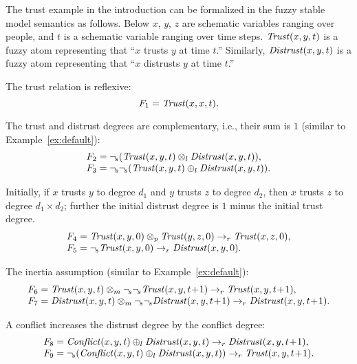 \documentclass[runningheads]{llncs}
\def\ba{\begin{array}}
\def\ea{\end{array}}
\def\i#1{\hbox{\it #1\/}}
\def\sneg{\sim\!\!}
\def\rar{\rightarrow}
\def\i#1{\hbox{\itshape #1\/}}
\def\fand{\otimes}
\def\for{\oplus}
\begin{document}
\begin{example}\label{ex:trust}
The trust example in the introduction can be formalized in the fuzzy stable model semantics as follows. 
Below $x$, $y$, $z$ are schematic variables ranging over people, and $t$ is
a schematic variable ranging over time steps. $\i{Trust}(x,y,t)$
is a fuzzy atom representing that ``$x$ trusts $y$ at time $t$.''
Similarly, $\i{Distrust}(x,y,t)$ is a fuzzy atom representing that 
``$x$ distrusts $y$ at time $t$.'' 


The trust relation is reflexive: 
\[ 
  F_1 = \i{Trust}(x,x,t) .
\]





The trust and distrust degrees are complementary, i.e., their sum is
$1$ (similar to Example~\ref{ex:default}): %
\[ 
\ba l 
   F_2 = \neg_{\!s} (\i{Trust}(x,y,t)\fand_l \i{Distrust}(x,y,t)),  \\
   F_3 = \neg_{\!s} \neg_{\!s} (\i{Trust}(x,y,t)\for_l\i{Distrust}(x,y,t)).

\ea 
\]

Initially, if $x$ trusts $y$ to degree $d_1$ and $y$ trusts $z$ to
degree $d_2$, then $x$ trusts $z$ to degree $d_1\times d_2$; further
the initial distrust degree is $1$ minus the initial trust degree.
\[ 
\ba l
   F_4 = \i{Trust}(x,y,0)\fand_p\i{Trust}(y,z,0)\rar_r\i{Trust}(x,z,0), \\
   F_5 = \neg_{\!s}\i{Trust}(x,y,0)\rar_r\i{Distrust}(x,y,0).
\ea 
\]

The inertia assumption (similar to Example~\ref{ex:default}): %
\[
\ba l
    F_6 = \i{Trust}(x,y,t)\fand_m \neg_{\!s} \neg_{\!s}\i{Trust}(x,y,t\!+\!1)
          \rar_r \i{Trust}(x,y,t\!+\!1),  \\
    F_7 = \i{Distrust}(x,y,t)\fand_m \neg_{\!s} \neg_{\!s} \i{Distrust}(x,
    y, t\!+\!1) \rar_r \i{Distrust}(x,y,t\!+\!1).
\ea 
\]

A conflict increases the distrust
degree by the conflict degree: %
\[
\ba l
   F_8= \i{Conflict}(x,y,t)\for_l \i{Distrust}(x,y,t) 
        \rar_r\i{Distrust}(x, y, t\!+\!1), \\
   F_9 = \neg_{\!s}(\i{Conflict}(x, y, t)\for_l \i{Distrust}(x, y, t)) 
         \rar_r \i{Trust}(x,y,t\!+\!1).
\ea 
\]


\end{example}
\end{document}
